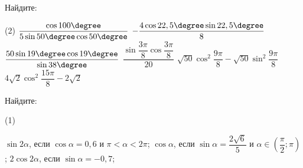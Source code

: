 \begin{class}[number=4]
	\begin{listofex}
		\item Найдите:
		\begin{tasks}(2)
			\task \( \dfrac{ \cos 100 \degree }{ 5\sin 50 \degree \cos 50 \degree } \)
			\task \( -\dfrac{ 4\cos 22,5 \degree \sin 22,5 \degree }{ 8 } \)
			\task \( \dfrac{ 50 \sin 19 \degree \cos 19 \degree }{ \sin 38 \degree } \)
			\task \( \dfrac{ \sin \dfrac{ 3\pi }{8 } \cos \dfrac{ 3\pi }{ 8 } }{ 20 } \)
			\task \( \sqrt{50} \cos^2 \dfrac{ 9\pi }{ 8 } - \sqrt{50} \sin^2 \dfrac{ 9\pi }{ 8 } \)
			\task \( 4\sqrt{2} \cos^2 \dfrac{ 15\pi }{ 8 } -2\sqrt{2} \)
		\end{tasks}
		\item Найдите: %
		\begin{tasks}(1)
			
			\task \(\sin 2 \alpha \), если \( \cos \alpha = 0,6 \) и \( \pi < \alpha < 2 \pi \);
			\task \( \cos \alpha \), если \( \sin \alpha = \dfrac{ 2 \sqrt{6} }{ 5 } \) и \( \alpha \in \left( \dfrac{ \pi }{ 2 }; \pi \right) \);
			\task \( 2\cos 2 \alpha \), если \( \sin \alpha=-0,7 \);
			
		\end{tasks}
		

\end{listofex}
\end{class}
